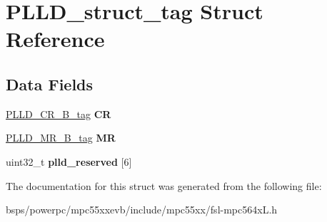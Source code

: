 \hypertarget{structPLLD__struct__tag}{}\section{P\+L\+L\+D\+\_\+struct\+\_\+tag Struct Reference}
\label{structPLLD__struct__tag}
\subsection*{Data Fields}
\begin{DoxyCompactItemize}
\item 
\mbox{\label{structPLLD__struct__tag_a99bfb1083541521a6ea61bac89072a42}} 
\mbox{\hyperlink{unionPLLD__CR__32B__tag}{P\+L\+L\+D\+\_\+\+C\+R\+\_\+B\+\_\+tag}} {\bfseries CR}
\item 
\mbox{\label{structPLLD__struct__tag_aa0297f07156febe3f8e392a7f9b79f95}} 
\mbox{\hyperlink{unionPLLD__MR__32B__tag}{P\+L\+L\+D\+\_\+\+M\+R\+\_\+B\+\_\+tag}} {\bfseries MR}
\item 
\mbox{\label{structPLLD__struct__tag_a94e687425b69b8cefca5f76117bad757}} 
uint32\+\_\+t {\bfseries plld\+\_\+reserved} \mbox{[}6\mbox{]}
\end{DoxyCompactItemize}


The documentation for this struct was generated from the following file\+:\begin{DoxyCompactItemize}
\item 
bsps/powerpc/mpc55xxevb/include/mpc55xx/fsl-\/mpc564x\+L.\+h\end{DoxyCompactItemize}
